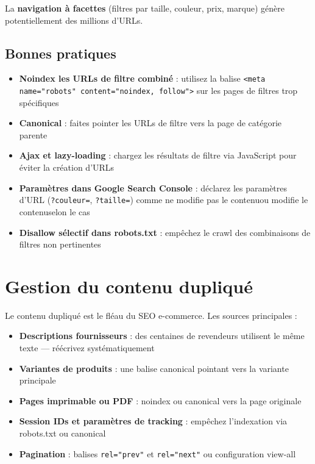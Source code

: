 \documentclass[12pt,a4paper,twoside]{report}
\newcommand{\keyword}[1]{\textbf{\textcolor{googleblue}{#1}}}
\begin{document}
La \keyword{ navigation à facettes} (filtres par taille, couleur, prix, marque) génère potentiellement des millions d'URLs.

\subsection{Bonnes pratiques}

\begin{itemize}
    \item \textbf{Noindex les URLs de filtre combiné} : utilisez la balise \texttt{<meta name="robots" content="noindex, follow">} sur les pages de filtres trop spécifiques
    \item \keyword{Canonical} : faites pointer les URLs de filtre vers la page de catégorie parente
    \item \textbf{Ajax et lazy-loading} : chargez les résultats de filtre via JavaScript pour éviter la création d'URLs
    \item \textbf{Paramètres dans Google Search Console} : déclarez les paramètres d'URL (\texttt{?couleur=}, \texttt{?taille=}) comme \og ne modifie pas le contenu\fg ou \og modifie le contenu\fg selon le cas
    \item \textbf{Disallow sélectif dans robots.txt} : empêchez le crawl des combinaisons de filtres non pertinentes
\end{itemize}

\section{Gestion du contenu dupliqué}

Le contenu dupliqué est le fléau du SEO e-commerce. Les sources principales :

\begin{itemize}
    \item \textbf{Descriptions fournisseurs} : des centaines de revendeurs utilisent le même texte --- réécrivez systématiquement
    \item \textbf{Variantes de produits} : une balise canonical pointant vers la variante principale
    \item \textbf{Pages imprimable ou PDF} : noindex ou canonical vers la page originale
    \item \textbf{Session IDs et paramètres de tracking} : empêchez l'indexation via robots.txt ou canonical
    \item \textbf{Pagination} : balises \texttt{rel="prev"} et \texttt{rel="next"} ou configuration \og view-all\fg
\end{itemize}
\end{document}
